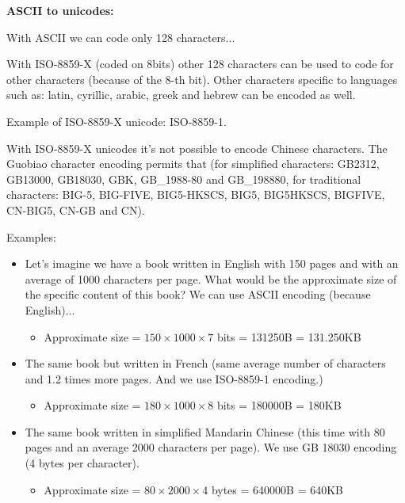 \documentclass[handout]{beamer}[10pt, usepdftitle=false]
\begin{document}
	\begin{frame}
	
	\textbf{ASCII to unicodes:}
		\vspace*{1em}	
	
	With ASCII we can code only 128 characters...
		\vspace*{0.5em}	
	
	With ISO-8859-X (coded on 8bits) other 128 characters can be used to code for other characters (because of the 8-th bit). Other characters specific to languages such as: latin, cyrillic, arabic, greek and hebrew can be encoded as well. 
	\vspace*{0.5em}		
		
	Example of ISO-8859-X unicode: ISO-8859-1.
	\vspace*{0.5em}	
	
	With ISO-8859-X unicodes it's not possible to encode Chinese characters. The Guobiao character encoding permits that (for simplified characters: GB2312, GB13000, GB18030, GBK, GB\_1988-80 and GB\_198880, for traditional characters:  BIG-5, BIG-FIVE, BIG5-HKSCS, BIG5, BIG5HKSCS, BIGFIVE, CN-BIG5, CN-GB and CN).		
		
	
	\end{frame}
	
	\begin{frame}
	
	Examples:
	\vspace*{0.6em}
	
	\begin{itemize}
		\item{Let's imagine we have a book written in English with 150 pages and with an average of 1000 characters per page. What would be the approximate size of the specific content of this book? We can use ASCII encoding (because English)...
			\begin{itemize}
				\item{Approximate size = $150 \times 1000 \times 7$ bits = 131250B = 131.250KB}
			\end{itemize}
		 }
		\item{The same book but written in French (same average number of characters and 1.2 times more pages. And we use ISO-8859-1 encoding.)
			\begin{itemize}
				\item{Approximate size = $180 \times 1000 \times 8$ bits = 180000B = 180KB}
			\end{itemize}					
		}	
		\item{The same book written in simplified Mandarin Chinese (this time with 80 pages and an average 2000 characters per page). We use GB 18030 encoding (4 bytes per character).
			\begin{itemize}
				\item{Approximate size = $80 \times 2000 \times 4$ bytes = 640000B = 640KB}
			\end{itemize}
		}
	\end{itemize}		

	\end{frame}
\end{document}
